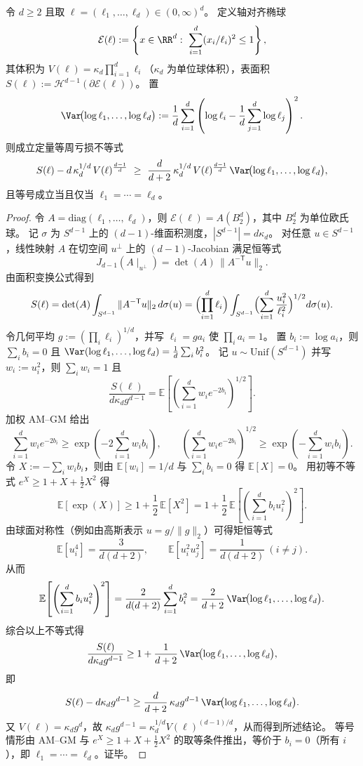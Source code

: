 \begin{theorem}[椭球等周亏损的对数轴长方差下界]\label{thm:pom-ellipsoid-isoperimetric-variance}
令 \(d\ge 2\) 且取 \(\ell=(\ell_1,\dots,\ell_d)\in(0,\infty)^d\)。
定义轴对齐椭球
\[
\mathcal E(\ell):=\left\{x\in\RR^d:\ \sum_{i=1}^{d}(x_i/\ell_i)^2\le 1\right\},
\]
其体积为 \(V(\ell)=\kappa_d\prod_{i=1}^{d}\ell_i\)（\(\kappa_d\) 为单位球体积），表面积 \(S(\ell):=\mathcal H^{d-1}(\partial \mathcal E(\ell))\)。
置
\[
\Var\!\bigl(\log\ell_1,\dots,\log\ell_d\bigr)
:=\frac1d\sum_{i=1}^{d}\left(\log\ell_i-\frac1d\sum_{j=1}^d\log\ell_j\right)^2.
\]
则成立定量等周亏损不等式
\[
S(\ell)-d\,\kappa_d^{1/d}\,V(\ell)^{\frac{d-1}{d}}
\ \ge\
\frac{d}{d+2}\,\kappa_d^{1/d}\,V(\ell)^{\frac{d-1}{d}}\,
\Var\!\bigl(\log\ell_1,\dots,\log\ell_d\bigr),
\]
且等号成立当且仅当 \(\ell_1=\cdots=\ell_d\)。
\end{theorem}
\begin{proof}
令 \(A=\mathrm{diag}(\ell_1,\dots,\ell_d)\)，则 \(\mathcal E(\ell)=A(B_2^d)\)，其中 \(B_2^d\) 为单位欧氏球。
记 \(\sigma\) 为 \(S^{d-1}\) 上的 \((d-1)\)-维面积测度，\(|S^{d-1}|=d\kappa_d\)。
对任意 \(u\in S^{d-1}\)，线性映射 \(A\) 在切空间 \(u^\perp\) 上的 \((d-1)\)-Jacobian 满足恒等式
\[
J_{d-1}\!\left(A\mid_{u^\perp}\right)=\det(A)\,\|A^{-{\mathsf T}}u\|_2.
\]
由面积变换公式得到
\[
S(\ell)=\det(A)\int_{S^{d-1}}\|A^{-{\mathsf T}}u\|_2\,d\sigma(u)
=\Bigl(\prod_{i=1}^d\ell_i\Bigr)\int_{S^{d-1}}\Bigl(\sum_{i=1}^d\frac{u_i^2}{\ell_i^2}\Bigr)^{1/2}d\sigma(u).
\]
令几何平均 \(g:=(\prod_i\ell_i)^{1/d}\)，并写 \(\ell_i=ga_i\) 使 \(\prod_i a_i=1\)。
置 \(b_i:=\log a_i\)，则 \(\sum_i b_i=0\) 且
\(
\Var(\log\ell_1,\dots,\log\ell_d)=\frac1d\sum_i b_i^2
\)。
记 \(u\sim\mathrm{Unif}(S^{d-1})\) 并写 \(w_i:=u_i^2\)，则 \(\sum_i w_i=1\) 且
\[
\frac{S(\ell)}{d\kappa_d g^{d-1}}
=\mathbb E\!\left[\left(\sum_{i=1}^d w_i e^{-2b_i}\right)^{1/2}\right].
\]
加权 AM--GM 给出
\[
\sum_{i=1}^d w_ie^{-2b_i}\ge \exp\!\left(-2\sum_{i=1}^d w_ib_i\right),
\qquad
\left(\sum_{i=1}^d w_ie^{-2b_i}\right)^{1/2}\ge \exp\!\left(-\sum_{i=1}^d w_ib_i\right).
\]
令 \(X:=-\sum_i w_ib_i\)，则由 \( \mathbb E[w_i]=1/d \) 与 \(\sum_i b_i=0\) 得 \(\mathbb E[X]=0\)。
用初等不等式 \(e^X\ge 1+X+\frac12X^2\) 得
\[
\mathbb E\!\left[\exp(X)\right]\ge 1+\frac12\,\mathbb E[X^2]
=1+\frac12\,\mathbb E\!\left[\left(\sum_{i=1}^d b_i u_i^2\right)^2\right].
\]
由球面对称性（例如由高斯表示 \(u=g/\|g\|_2\)）可得矩恒等式
\[
\mathbb E[u_i^4]=\frac{3}{d(d+2)},\qquad
\mathbb E[u_i^2u_j^2]=\frac{1}{d(d+2)}\ (i\ne j).
\]
从而
\[
\mathbb E\!\left[\left(\sum_{i=1}^d b_i u_i^2\right)^2\right]
=\frac{2}{d(d+2)}\sum_{i=1}^d b_i^2
=\frac{2}{d+2}\,\Var\!\bigl(\log\ell_1,\dots,\log\ell_d\bigr).
\]
综合以上不等式得
\[
\frac{S(\ell)}{d\kappa_d g^{d-1}}
\ge
1+\frac{1}{d+2}\,\Var\!\bigl(\log\ell_1,\dots,\log\ell_d\bigr),
\]
即
\[
S(\ell)-d\kappa_d g^{d-1}
\ge
\frac{d}{d+2}\,\kappa_d g^{d-1}\,\Var\!\bigl(\log\ell_1,\dots,\log\ell_d\bigr).
\]
又 \(V(\ell)=\kappa_d g^d\)，故 \(\kappa_d g^{d-1}=\kappa_d^{1/d}V(\ell)^{(d-1)/d}\)，从而得到所述结论。
等号情形由 AM--GM 与 \(e^X\ge 1+X+\frac12X^2\) 的取等条件推出，等价于 \(b_i=0\)（所有 \(i\)），即 \(\ell_1=\cdots=\ell_d\)。证毕。
\end{proof}

